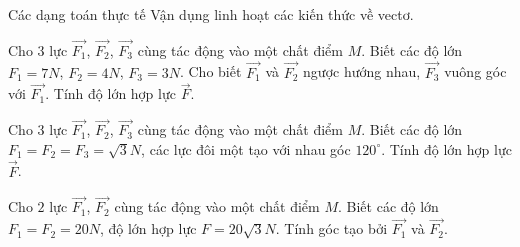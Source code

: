 \begin{dang}{Các dạng toán thực tế}
	Vận dụng linh hoạt các kiến thức về vectơ.
\end{dang}
\begin{vd}%
	Cho $3$ lực $\overrightarrow{F_1}$, $\overrightarrow{F_2}$, $\overrightarrow{F_3}$ cùng tác động vào một chất điểm $M$. Biết các độ lớn $F_1=7N$, $F_2=4N$, $F_3=3N$. Cho biết $\overrightarrow{F_1}$ và $\overrightarrow{F_2}$ ngược hướng nhau, $\overrightarrow{F_3}$ vuông góc với $\overrightarrow{F_1}$. Tính độ lớn hợp lực $\overrightarrow{F}$.
\end{vd}
\begin{vd}%
	Cho $3$ lực $\overrightarrow{F_1}$, $\overrightarrow{F_2}$, $\overrightarrow{F_3}$ cùng tác động vào một chất điểm $M$. Biết các độ lớn $F_1=F_2=F_3=\sqrt{3}N$, các lực đôi một tạo với nhau góc $120^\circ$. Tính độ lớn hợp lực $\overrightarrow{F}$.
\end{vd}
\begin{vd}%
	Cho $2$ lực $\overrightarrow{F_1}$, $\overrightarrow{F_2}$ cùng tác động vào một chất điểm $M$. Biết các độ lớn $F_1=F_2=20N$, độ lớn hợp lực $F=20\sqrt{3}N$. Tính góc tạo bởi $\overrightarrow{F_1}$ và $\overrightarrow{F_2}$.
\end{vd}
